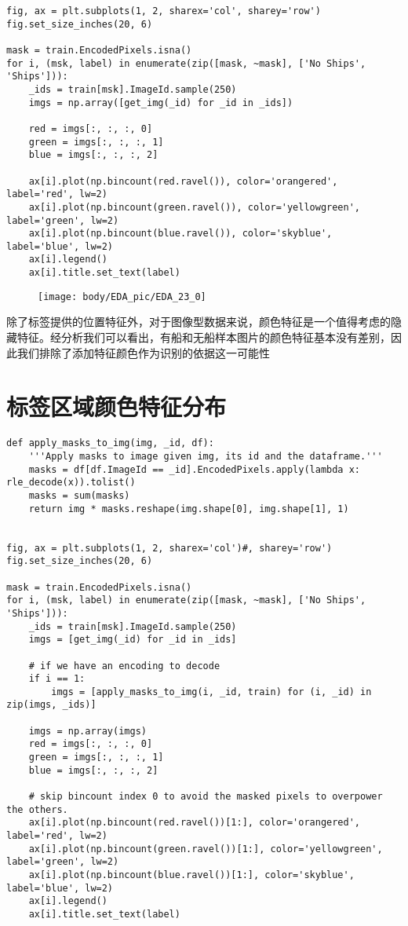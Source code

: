 \begin{lstlisting}
fig, ax = plt.subplots(1, 2, sharex='col', sharey='row')
fig.set_size_inches(20, 6)

mask = train.EncodedPixels.isna()
for i, (msk, label) in enumerate(zip([mask, ~mask], ['No Ships', 'Ships'])):
    _ids = train[msk].ImageId.sample(250)
    imgs = np.array([get_img(_id) for _id in _ids])
    
    red = imgs[:, :, :, 0]
    green = imgs[:, :, :, 1]
    blue = imgs[:, :, :, 2]
    
    ax[i].plot(np.bincount(red.ravel()), color='orangered', label='red', lw=2)
    ax[i].plot(np.bincount(green.ravel()), color='yellowgreen', label='green', lw=2)
    ax[i].plot(np.bincount(blue.ravel()), color='skyblue', label='blue', lw=2)
    ax[i].legend()
    ax[i].title.set_text(label)
\end{lstlisting}

\begin{figure}[htbp]
\centering
\texttt{[image: body/EDA\_pic/EDA\_23\_0]}
\caption{}
\end{figure}

除了标签提供的位置特征外，对于图像型数据来说，颜色特征是一个值得考虑的隐藏特征。经分析我们可以看出，有船和无船样本图片的颜色特征基本没有差别，因此我们排除了添加特征颜色作为识别的依据这一可能性

\section{标签区域颜色特征分布}\label{ux6807ux7b7eux533aux57dfux989cux8272ux7279ux5f81ux5206ux5e03}

\begin{lstlisting}
def apply_masks_to_img(img, _id, df):
    '''Apply masks to image given img, its id and the dataframe.'''
    masks = df[df.ImageId == _id].EncodedPixels.apply(lambda x: rle_decode(x)).tolist()
    masks = sum(masks)
    return img * masks.reshape(img.shape[0], img.shape[1], 1)


fig, ax = plt.subplots(1, 2, sharex='col')#, sharey='row')
fig.set_size_inches(20, 6)

mask = train.EncodedPixels.isna()
for i, (msk, label) in enumerate(zip([mask, ~mask], ['No Ships', 'Ships'])):
    _ids = train[msk].ImageId.sample(250)
    imgs = [get_img(_id) for _id in _ids]
    
    # if we have an encoding to decode
    if i == 1:
        imgs = [apply_masks_to_img(i, _id, train) for (i, _id) in zip(imgs, _ids)]

    imgs = np.array(imgs)
    red = imgs[:, :, :, 0]
    green = imgs[:, :, :, 1]
    blue = imgs[:, :, :, 2]
    
    # skip bincount index 0 to avoid the masked pixels to overpower the others.
    ax[i].plot(np.bincount(red.ravel())[1:], color='orangered', label='red', lw=2)
    ax[i].plot(np.bincount(green.ravel())[1:], color='yellowgreen', label='green', lw=2)
    ax[i].plot(np.bincount(blue.ravel())[1:], color='skyblue', label='blue', lw=2)
    ax[i].legend()
    ax[i].title.set_text(label)
\end{lstlisting}

